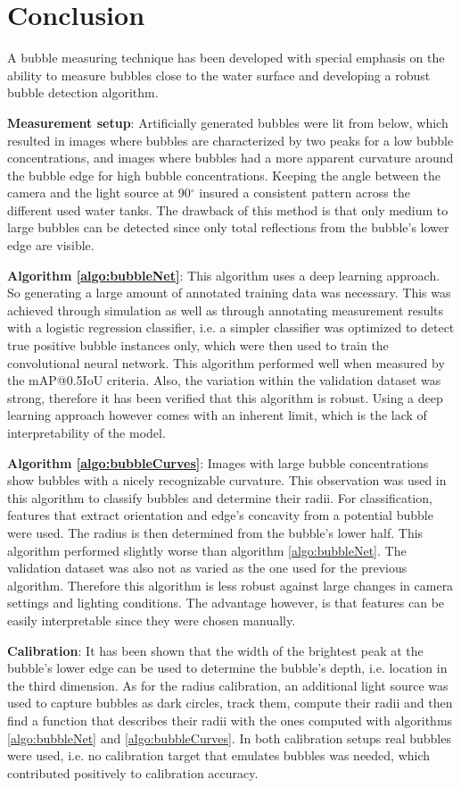 \chapter{Conclusion}\label{discussion}
A bubble measuring technique has been developed with special emphasis on the ability to measure bubbles close to the water surface and developing a robust bubble detection algorithm. 

\textbf{Measurement setup}: Artificially generated bubbles were lit from below, which resulted in images where bubbles are characterized by two peaks for a low bubble concentrations, and images where bubbles had a more apparent curvature around the bubble edge for high bubble concentrations. Keeping the angle between the camera and the light source at 90$^\circ$ insured a consistent pattern across the different used water tanks. The drawback of this method is that only medium to large bubbles can be detected since only total reflections from the bubble's lower edge are visible. 

\textbf{Algorithm \ref{algo:bubbleNet}}: This algorithm uses a deep learning approach. So generating a large amount of annotated training data was necessary. This was achieved through simulation as well as through annotating measurement results with a logistic regression classifier, i.e. a simpler classifier was optimized to detect true positive bubble instances only, which were then used to train the convolutional neural network. This algorithm performed well when measured by the mAP@0.5IoU criteria. Also, the variation within the validation dataset was strong, therefore it has been verified that this algorithm is robust. Using a deep learning approach however comes with an inherent limit, which is the lack of interpretability of the model. 

\textbf{Algorithm \ref{algo:bubbleCurves}}: Images with large bubble concentrations show bubbles with a nicely recognizable curvature. This observation was used in this algorithm to classify bubbles and determine their radii. For classification, features that extract orientation and edge's concavity from a potential bubble were used. The radius is then determined from the bubble's lower half. This algorithm performed slightly worse than algorithm \ref{algo:bubbleNet}. The validation dataset was also not as varied as the one used for the previous algorithm. Therefore this algorithm is less robust against large changes in camera settings and lighting conditions. The advantage however, is that features can be easily interpretable since they were chosen manually. 

\textbf{Calibration}: It has been shown that the width of the brightest peak at the bubble's lower edge can be used to determine the bubble's depth, i.e. location in the third dimension. As for the radius calibration, an additional light source was used to capture bubbles as dark circles, track them, compute their radii and then find a function that describes their radii with the ones computed with algorithms \ref{algo:bubbleNet} and \ref{algo:bubbleCurves}. In both calibration setups real bubbles were used, i.e. no calibration target that emulates bubbles was needed, which contributed positively to calibration accuracy. 
